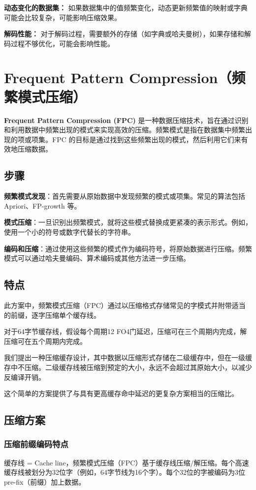 \documentclass[12pt]{article}
\begin{document}
\textbf{动态变化的数据集：} 如果数据集中的值频繁变化，动态更新频繁值的映射或字典可能会比较复杂，可能影响压缩效果。

\textbf{解码性能：} 对于解码过程，需要额外的存储（如字典或哈夫曼树），如果存储和解码过程不够优化，可能会影响性能。

\section{Frequent Pattern Compression（频繁模式压缩）}

\textbf{Frequent Pattern Compression (FPC)} 是一种数据压缩技术，旨在通过识别和利用数据中频繁出现的模式来实现高效的压缩。频繁模式是指在数据集中频繁出现的项或项集。FPC 的目标是通过找到这些频繁出现的模式，然后利用它们来有效地压缩数据。

\subsection{步骤}
\textbf{频繁模式发现}：首先需要从原始数据中发现频繁的模式或项集。常见的算法包括 Apriori、FP-growth 等。

\textbf{模式压缩}：一旦识别出频繁模式，就将这些模式替换成更紧凑的表示形式。例如，使用一个小的符号或数字代替长的字符串。

\textbf{编码和压缩}：通过使用这些频繁的模式作为编码符号，将原始数据进行压缩。频繁模式可以通过哈夫曼编码、算术编码或其他方法进一步压缩。

\subsection{特点}
此方案中，频繁模式压缩（FPC）通过以压缩格式存储常见的字模式并附带适当的前缀，逐字压缩单个缓存线。

对于64字节缓存线，假设每个周期12 FO4门延迟，压缩可在三个周期内完成，解压缩可在五个周期内完成。

我们提出一种压缩缓存设计，其中数据以压缩形式存储在二级缓存中，但在一级缓存中不压缩。二级缓存线被压缩到预定的大小，永远不会超过其原始大小，以减少反编译开销。
  
这个简单的方案提供了与具有更高缓存命中延迟的更复杂方案相当的压缩比。

\subsection{压缩方案}

\subsubsection{压缩前缀编码特点}
缓存线 = Cache line，频繁模式压缩（FPC）基于缓存线压缩/解压缩。每个高速缓存线被划分为32位字（例如，64字节线为16个字）。每个32位的字被编码为3位pre-fix（前缀）加上数据。
\end{document}
